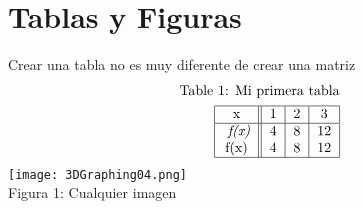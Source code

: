 \documentclass{article}
\begin{document}
\section{Tablas y Figuras}
Crear una tabla no es muy diferente de crear una matriz
\begin{align*}
    \text{Table 1: Mi primera tabla}\\
    \begin{tabular}{|c||c|c|c|}
      \hline 
        x & 1 & 2 & 3 \\
        \hline
       \textit{ f(x)} & 4 & 8 & 12 \\
        f(x) & 4 & 8 & 12 \\
    \hline
    \end{tabular}
\end{align*}  
\texttt{[image: 3DGraphing04.png]} \\
\centering Figura 1: Cualquier imagen
    
\end{document}
